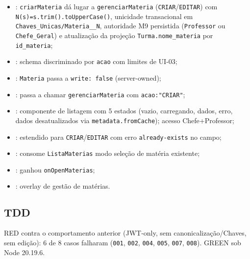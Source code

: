 \begin{itemize}
  \item {}: \texttt{criarMateria} dá lugar a
  \texttt{gerenciarMateria} (\texttt{CRIAR}/\texttt{EDITAR}) com
  \texttt{N(s)=s.trim().toUpperCase()}, unicidade transacional em
  \texttt{Chaves\_Unicas/Materia\_\_N}, autoridade M9 persistida
  (\texttt{Professor} ou \texttt{Chefe\_Geral}) e atualização da projeção
  \texttt{Turma.nome\_materia} por \texttt{id\_materia};
  \item {}: schema discriminado por
  \texttt{acao} com limites de UI-03;
  \item {}: \texttt{Materia} passa a \texttt{write: false}
  (server-owned);
  \item {}: passa a
  chamar \texttt{gerenciarMateria} com \texttt{acao:"CRIAR"};
  \item {}: componente de
  listagem com 5 estados (vazio, carregando, dados, erro, dados desatualizados
  via \texttt{metadata.fromCache}); acesso Chefe+Professor;
  \item {}: estendido
  para \texttt{CRIAR}/\texttt{EDITAR} com erro \texttt{already-exists} no
  campo;
  \item {}: consome
  \texttt{ListaMaterias} modo seleção de matéria existente;
  \item {}: ganhou
  \texttt{onOpenMaterias};
  \item {}: overlay de gestão de matérias.
\end{itemize}

\subsection{TDD}

RED contra o comportamento anterior (JWT-only, sem canonicalização/Chaves, sem
edição): 6 de 8 casos falharam (\texttt{001}, \texttt{002}, \texttt{004},
\texttt{005}, \texttt{007}, \texttt{008}). GREEN sob Node 20.19.6.

